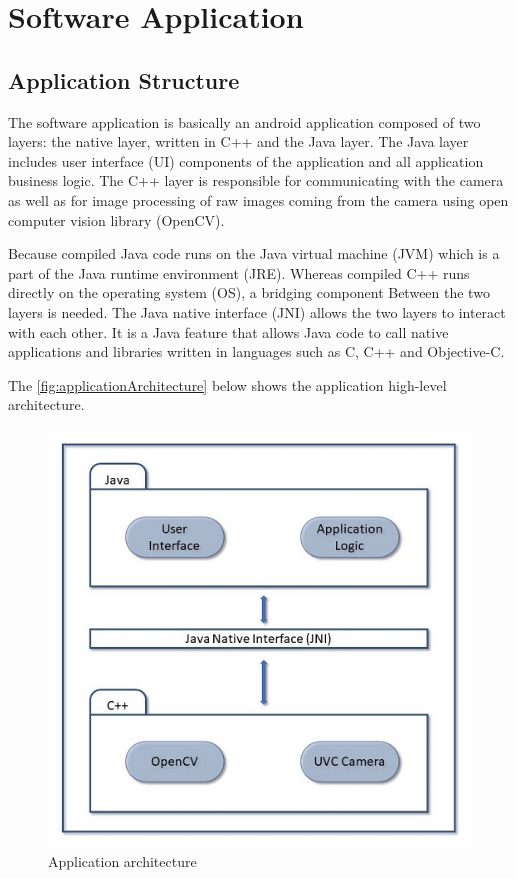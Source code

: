 
\chapter{Software Application}\label{Software Application}

\section{Application Structure}
The software application is basically an android application composed of two layers: the native layer, written in C++ and the Java layer. 
The Java layer includes user interface (UI) components of the application and all application business logic. 
The C++ layer is responsible for communicating with the camera as well as for image processing of raw images coming from the camera using open computer vision library (OpenCV).

Because compiled Java code runs on the Java virtual machine (JVM) which is a part of the Java runtime environment (JRE). Whereas compiled C++ runs directly on the operating system (OS), a bridging component Between the two layers is needed.
The Java native interface (JNI) allows the two layers to interact with each other. It is a Java feature that allows Java code to call native applications and libraries written in languages such as C, C++ and Objective-C.

The \autoref{fig:applicationArchitecture} below shows the application high-level architecture.


\begin{figure}[H]
\centering
\includegraphics{figures/applicationArchitecture.JPG}
\caption[Application architecture]{Application architecture}\label{fig:applicationArchitecture}
\end{figure}


